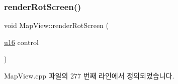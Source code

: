 \mbox{\label{class_map_view_a2e462e6466f052427cd894a7c047fa68}} 
\subsubsection{\texorpdfstring{render\+Rot\+Screen()}{renderRotScreen()}}
{\footnotesize\ttfamily void Map\+View\+::render\+Rot\+Screen (\begin{DoxyParamCaption}\item[{\mbox{\hyperlink{_system_8h_a9e6c91d77e24643b888dbd1a1a590054}{u16}}}]{control }\end{DoxyParamCaption})}



Map\+View.\+cpp 파일의 277 번째 라인에서 정의되었습니다.


